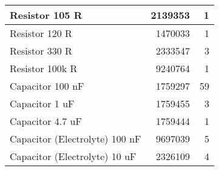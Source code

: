 \begin{table}[H]
\begin{center}
\begin{tabular}{| l | r | r|}
\hline
Resistor 105 R & 2139353 & 1 \\
\hline
Resistor 120 R & 1470033 & 1 \\
\hline
Resistor 330 R & 2333547 & 3 \\
\hline
Resistor 100k R & 9240764 & 1 \\
\hline
Capacitor 100 nF & 1759297 & 59 \\
\hline
Capacitor 1 uF & 1759455 & 3 \\
\hline
Capacitor 4.7 uF & 1759444 & 1 \\
\hline
Capacitor (Electrolyte) 100 nF & 9697039 & 5 \\
\hline
Capacitor (Electrolyte) 10 uF & 2326109 & 4 \\
\hline
\end{tabular}
\end{center}
\end{table}

